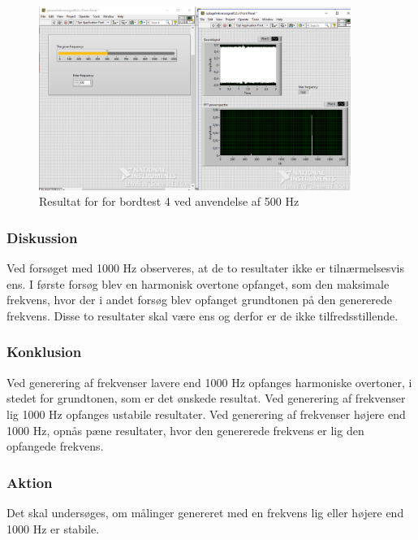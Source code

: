 			\begin{figure}[htb]
			\centering
				\includegraphics[width=4in]{Bordtest4500Hz}
				\caption{Resultat for for bordtest 4 ved anvendelse af 500 Hz}	
				\label{fig:bt4500}
			\end{figure} 
			
				
			  
			\subsubsection{Diskussion}
			Ved forsøget med 1000 Hz observeres, at de to resultater ikke er tilnærmelsesvis ens. I første forsøg blev en harmonisk overtone opfanget, som den maksimale frekvens, hvor der i andet forsøg blev opfanget grundtonen på den genererede frekvens. Disse to resultater skal være ens og derfor er de ikke tilfredsstillende.
			
			\subsubsection{Konklusion}
			Ved generering af frekvenser lavere end 1000 Hz opfanges harmoniske overtoner, i stedet for grundtonen, som er det ønskede resultat. 
			Ved generering af frekvenser lig 1000 Hz opfanges ustabile resultater. 
			Ved generering af frekvenser højere end 1000 Hz, opnås pæne resultater, hvor den genererede frekvens er lig den opfangede frekvens.  
			  
			\subsubsection{Aktion}
			Det skal undersøges, om målinger genereret med en frekvens lig eller højere end 1000 Hz er stabile. 


		
	
	
	

	